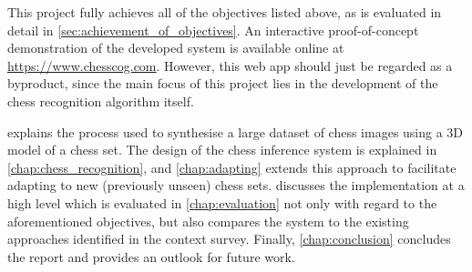 This project fully achieves all of the objectives listed above, as is evaluated in detail in \cref{sec:achievement_of_objectives}.
An interactive proof-of-concept demonstration of the developed system is available online at \url{https://www.chesscog.com}.
However, this web app should just be regarded as a byproduct, since the main focus of this project lies in the development of the chess recognition algorithm itself.

 explains the process used to synthesise a large dataset of chess images using a 3D model of a chess set.
The design of the chess inference system is explained in \cref{chap:chess_recognition}, and \cref{chap:adapting} extends this approach to facilitate adapting to new (previously unseen) chess sets.
 discusses the implementation at a high level which is evaluated in \cref{chap:evaluation} not only with regard to the aforementioned objectives, but also compares the system to the existing approaches identified in the context survey.
Finally, \cref{chap:conclusion} concludes the report and provides an outlook for future work.